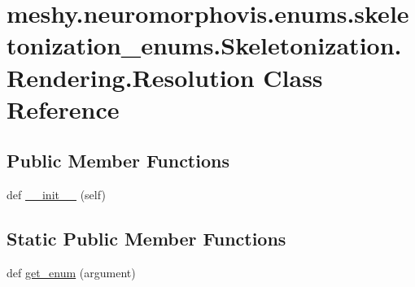 \hypertarget{classmeshy_1_1neuromorphovis_1_1enums_1_1skeletonization__enums_1_1Skeletonization_1_1Rendering_1_1Resolution}{}\section{meshy.\+neuromorphovis.\+enums.\+skeletonization\+\_\+enums.\+Skeletonization.\+Rendering.\+Resolution Class Reference}
\label{classmeshy_1_1neuromorphovis_1_1enums_1_1skeletonization__enums_1_1Skeletonization_1_1Rendering_1_1Resolution}


 


\subsection*{Public Member Functions}
\begin{DoxyCompactItemize}
\item 
def \hyperlink{classmeshy_1_1neuromorphovis_1_1enums_1_1skeletonization__enums_1_1Skeletonization_1_1Rendering_1_1Resolution_a3e07c43f40f9340aea32b8794b9cb2a8}{\+\_\+\+\_\+init\+\_\+\+\_\+} (self)\hypertarget{classmeshy_1_1neuromorphovis_1_1enums_1_1skeletonization__enums_1_1Skeletonization_1_1Rendering_1_1Resolution_a3e07c43f40f9340aea32b8794b9cb2a8}{}\label{classmeshy_1_1neuromorphovis_1_1enums_1_1skeletonization__enums_1_1Skeletonization_1_1Rendering_1_1Resolution_a3e07c43f40f9340aea32b8794b9cb2a8}

\end{DoxyCompactItemize}
\subsection*{Static Public Member Functions}
\begin{DoxyCompactItemize}
\item 
def \hyperlink{classmeshy_1_1neuromorphovis_1_1enums_1_1skeletonization__enums_1_1Skeletonization_1_1Rendering_1_1Resolution_a7c38af4b1df098f0016fbe15d8d0f041}{get\+\_\+enum} (argument)\hypertarget{classmeshy_1_1neuromorphovis_1_1enums_1_1skeletonization__enums_1_1Skeletonization_1_1Rendering_1_1Resolution_a7c38af4b1df098f0016fbe15d8d0f041}{}\label{classmeshy_1_1neuromorphovis_1_1enums_1_1skeletonization__enums_1_1Skeletonization_1_1Rendering_1_1Resolution_a7c38af4b1df098f0016fbe15d8d0f041}

\end{DoxyCompactItemize}

